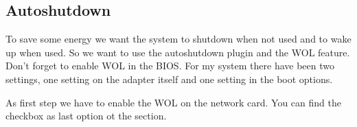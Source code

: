 

\subsection{Autoshutdown}\label{subsec:Autoshutdown}

To save some energy we want the system to shutdown when not used and to wake up
when used. So we want to use the autoshutdown plugin and the \gls{WOL} feature.
 Don't forget to enable \gls{WOL} in the BIOS. For my system
there have been two settings, one setting on the adapter itself and one setting
in the boot options.


As first step we have to enable the \gls{WOL} on the network card. You can find
the checkbox as last option ot the  section.


